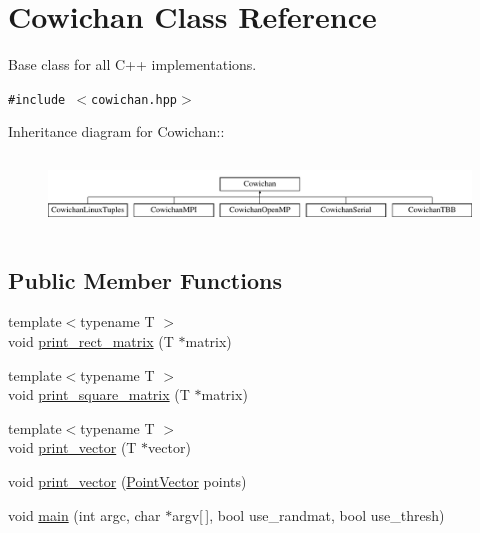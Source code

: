 \hypertarget{class_cowichan}{
\section{Cowichan Class Reference}
\label{class_cowichan}
}
Base class for all C++ implementations.  


{\tt \#include $<$cowichan.hpp$>$}

Inheritance diagram for Cowichan::\begin{figure}[H]
\begin{center}
\leavevmode
\includegraphics[height=2cm]{class_cowichan}
\end{center}
\end{figure}
\subsection*{Public Member Functions}
\begin{CompactItemize}
\item 
{\footnotesize template$<$typename T $>$ }\\void \hyperlink{class_cowichan_14e706ef5a5f7661a623c595d7ed76f1}{print\_\-rect\_\-matrix} (T $\ast$matrix)
\item 
{\footnotesize template$<$typename T $>$ }\\void \hyperlink{class_cowichan_e8fdfb7dd3e8be0a7e9dbc531b1298d2}{print\_\-square\_\-matrix} (T $\ast$matrix)
\item 
{\footnotesize template$<$typename T $>$ }\\void \hyperlink{class_cowichan_90f1155f5c35308796b142b15d681a4b}{print\_\-vector} (T $\ast$vector)
\item 
void \hyperlink{class_cowichan_3b974ae1693ac661fb079b28981ca885}{print\_\-vector} (\hyperlink{class_point}{PointVector} points)
\item 
void \hyperlink{class_cowichan_905f3eb45f21cdaa1c32a421d001fa4c}{main} (int argc, char $\ast$argv\mbox{[}$\,$\mbox{]}, bool use\_\-randmat, bool use\_\-thresh)
\end{CompactItemize}
